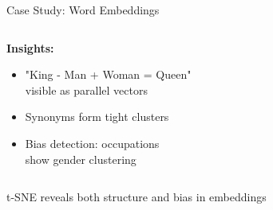 \documentclass[10pt]{beamer}
\newcommand{\conceptbox}[1]{\colorbox{upcblue!10}{\begin{minipage}{0.85\textwidth}\centering #1\end{minipage}}}
\begin{document}
\begin{frame}{Case Study: Word Embeddings}
\begin{columns}[T]
\begin{column}{0.48\textwidth}
\vspace{0.2cm}
\textbf{Insights:}
\begin{itemize}
\footnotesize
\item "King - Man + Woman = Queen"\\
visible as parallel vectors
\item Synonyms form tight clusters
\item Bias detection: occupations\\
show gender clustering
\end{itemize}
\end{column}
\end{columns}

\vspace{0.2cm}
\begin{center}
\conceptbox{\footnotesize t-SNE reveals both structure and bias in embeddings}
\end{center}
\end{frame}
\end{document}
